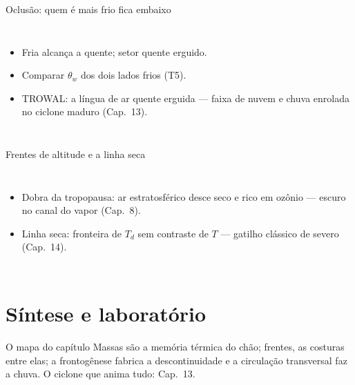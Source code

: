 \documentclass[aspectratio=169,11pt]{beamer}
\begin{document}
\begin{frame}{Oclusão: quem é mais frio fica embaixo}
  \begin{columns}
    \begin{itemize}
      \item Fria alcança a quente; setor quente erguido.
      \item Comparar $\theta_w$ dos dois lados frios (T5).
      \item TROWAL: a língua de ar quente erguida — faixa de nuvem e
            chuva enrolada no ciclone maduro (Cap.~13).
    \end{itemize}
  \end{columns}
\end{frame}

\begin{frame}{Frentes de altitude e a linha seca}
  \begin{columns}
    \begin{itemize}
      \item Dobra da tropopausa: ar estratosférico desce seco e rico
            em ozônio — escuro no canal do vapor (Cap.~8).
      \item Linha seca: fronteira de $T_d$ sem contraste de $T$ —
            gatilho clássico de severo (Cap.~14).
    \end{itemize}
  \end{columns}
\end{frame}

\section{Síntese e laboratório}

\begin{frame}{O mapa do capítulo}
  \vspace{0.6em}
  Massas são a memória térmica do chão; frentes, as costuras entre
  elas; a frontogênese fabrica a descontinuidade e a circulação
  transversal faz a chuva. O ciclone que anima tudo: Cap.~13.
\end{frame}
\end{document}
